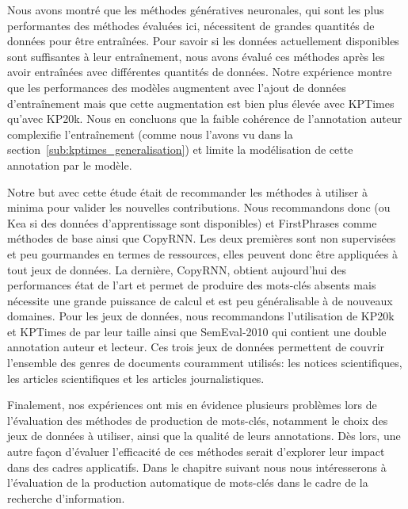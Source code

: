 Nous avons montré que les méthodes génératives neuronales, qui sont les plus performantes des méthodes évaluées ici, nécessitent de grandes quantités de données pour être entraînées.
Pour savoir si les données actuellement disponibles sont suffisantes à leur entraînement, nous avons évalué ces méthodes après les avoir entraînées avec différentes quantités de données.
Notre expérience montre que les performances des modèles augmentent avec l'ajout de données d'entraînement mais que cette augmentation est bien plus élevée avec KPTimes qu'avec KP20k.
Nous en concluons que la faible cohérence de l'annotation auteur complexifie l'entraînement (comme nous l'avons vu dans la section~\ref{sub:kptimes_generalisation}) et limite la modélisation de cette annotation par le modèle.

Notre but avec cette étude était de recommander les méthodes à utiliser à minima pour valider les nouvelles contributions. Nous recommandons donc \tfidf{} (ou Kea si des données d'apprentissage sont disponibles) et FirstPhrases comme méthodes de base ainsi que CopyRNN.
Les deux premières sont non supervisées et peu gourmandes en termes de ressources, elles peuvent donc être appliquées à tout jeux de données.
La dernière, CopyRNN, obtient aujourd'hui des performances état de l'art et permet de produire des mots-clés absents mais nécessite une grande puissance de calcul et est peu généralisable à de nouveaux domaines.
Pour les jeux de données, nous recommandons l'utilisation de KP20k et KPTimes de par leur taille ainsi que SemEval-2010 qui contient une double annotation auteur et lecteur. Ces trois jeux de données permettent de couvrir l'ensemble des genres de documents couramment utilisés: les notices scientifiques, les articles scientifiques et les articles journalistiques.

Finalement, nos expériences ont mis en évidence plusieurs problèmes lors de l'évaluation des méthodes de production de mots-clés, notamment le choix des jeux de données à utiliser, ainsi que la qualité de leurs annotations.
Dès lors, une autre façon d'évaluer l'efficacité de ces méthodes serait d'explorer leur impact dans des cadres applicatifs.
Dans le chapitre suivant nous nous intéresserons à l'évaluation de la production automatique de mots-clés dans le cadre de la recherche d'information.